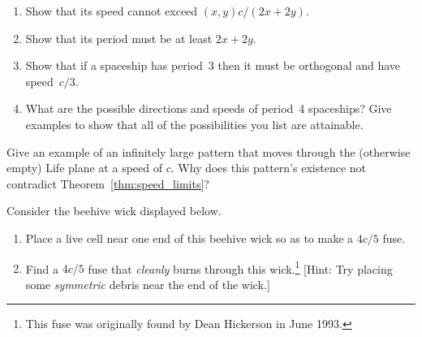 \begin{multicols}{2}
\begin{problem}
		\begin{enumerate}[label=\bf\color{ocre}(\alph*)]
			\item Show that its speed cannot exceed $(x,y)c/(2x+2y)$.
			
			\item Show that its period must be at least $2x+2y$.
			
			\item Show that if a spaceship has period~3 then it must be orthogonal and have speed~$c/3$.
			
			\item What are the possible directions and speeds of period~4 spaceships? Give examples to show that all of the possibilities you list are attainable.
		\end{enumerate}
	\end{problem}
	
	
	\mfilbreak
	
	
	\begin{problem}\label{exer:infinite_spaceship} 
		Give an example of an infinitely large pattern that moves through the (otherwise empty) Life plane at a speed of $c$. Why does this pattern's existence not contradict Theorem~\ref{thm:speed_limits}?
	\end{problem}
	
	
	\mfilbreak
	
	
	\begin{problem}\label{exer:4c5_fuse}
		Consider the beehive wick displayed below.
		\begin{center}
		\end{center}
		
		\begin{enumerate}[label=\bf\color{ocre}(\alph*)]
			\item {} Place a live cell near one end of this beehive wick so as to make a $4c/5$ fuse.
			
			\item {} Find a $4c/5$ fuse that \emph{cleanly} burns through this wick.\footnote{This fuse was originally found by Dean Hickerson in June 1993.} [Hint: Try placing some \emph{symmetric} debris near the end of the wick.]
		\end{enumerate}
	\end{problem}
	

\end{multicols}
